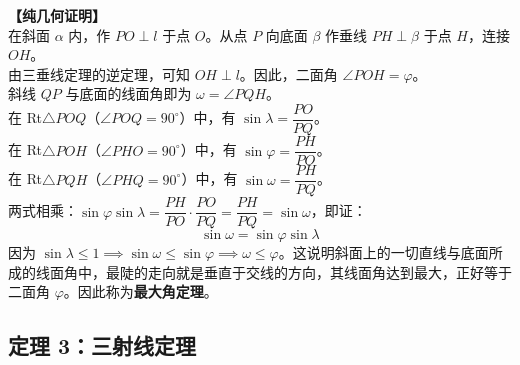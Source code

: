 \documentclass[11pt,a4paper]{ctexart}
\begin{document}
\noindent\textbf{【纯几何证明】}\\
在斜面 $\alpha$ 内，作 $PO \perp l$ 于点 $O$。从点 $P$ 向底面 $\beta$ 作垂线 $PH \perp \beta$ 于点 $H$，连接 $OH$。\\
由三垂线定理的逆定理，可知 $OH \perp l$。因此，二面角 $\angle POH = \varphi$。\\
斜线 $QP$ 与底面的线面角即为 $\omega = \angle PQH$。\\
在 Rt$\triangle POQ$（$\angle POQ = 90^\circ$）中，有 $\sin\lambda = \dfrac{PO}{PQ}$。\\
在 Rt$\triangle POH$（$\angle PHO = 90^\circ$）中，有 $\sin\varphi = \dfrac{PH}{PO}$。\\
在 Rt$\triangle PQH$（$\angle PHQ = 90^\circ$）中，有 $\sin\omega = \dfrac{PH}{PQ}$。\\
两式相乘：$\sin\varphi \sin\lambda = \dfrac{PH}{PO} \cdot \dfrac{PO}{PQ} = \dfrac{PH}{PQ} = \sin\omega$，即证：
\[ \boxed{\sin\omega = \sin\varphi \sin\lambda} \]
因为 $\sin\lambda \le 1 \implies \sin\omega \le \sin\varphi \implies \omega \le \varphi$。这说明斜面上的一切直线与底面所成的线面角中，最陡的走向就是垂直于交线的方向，其线面角达到最大，正好等于二面角 $\varphi$。因此称为\textbf{最大角定理}。

\subsection{定理 3：三射线定理}
\end{document}
